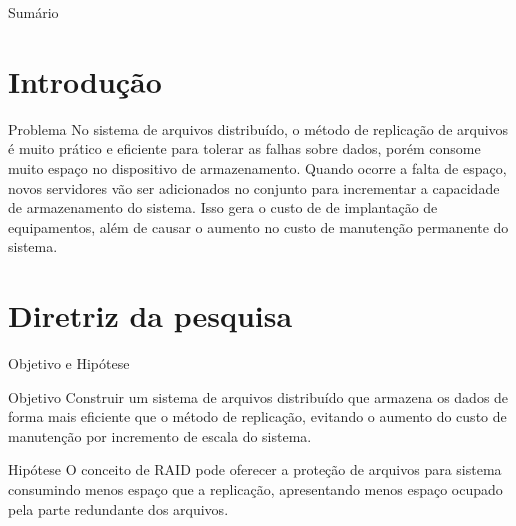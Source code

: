 
\begin{frame}
\titlepage
\end{frame}

\begin{frame}{Sumário}
  \tableofcontents
\end{frame}

\section{Introdução}

\begin{frame}{Problema}
	No sistema de arquivos distribuído, o método de replicação de arquivos é muito prático e eficiente para tolerar as falhas sobre dados, porém consome muito espaço no dispositivo de armazenamento. Quando ocorre a falta de espaço, novos servidores vão ser adicionados no conjunto para incrementar a capacidade de armazenamento do sistema. Isso gera o custo de de implantação de equipamentos, além de causar o aumento no custo de manutenção permanente do sistema.
\end{frame} 

\section{Diretriz da pesquisa}
\begin{frame}{Objetivo e Hipótese}
	
	\begin{block}{Objetivo}
		Construir um sistema de arquivos distribuído que armazena os dados de forma mais eficiente que o método de replicação, evitando o aumento do custo de manutenção por incremento de escala do sistema.
		
	\end{block}
	
	\begin{block}{Hipótese}
		O conceito de RAID pode oferecer a proteção de arquivos para sistema consumindo menos espaço que a replicação, apresentando menos espaço ocupado pela parte redundante dos arquivos. 
		
	\end{block}
	
\end{frame}


